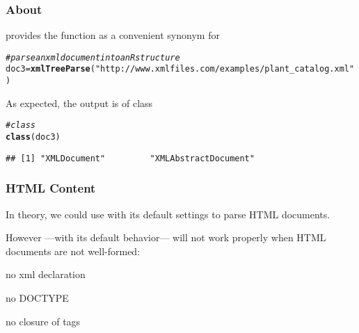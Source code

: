 \documentclass[12pt]{beamer}\usepackage[]{graphicx}\usepackage[]{color}
\makeatletter
\newcommand{\hlstr}[1]{\textcolor[rgb]{0.192,0.494,0.8}{#1}}%
\newcommand{\hlcom}[1]{\textcolor[rgb]{0.678,0.584,0.686}{\textit{#1}}}%
\newcommand{\hlstd}[1]{\textcolor[rgb]{0.345,0.345,0.345}{#1}}%
\newcommand{\hlkwb}[1]{\textcolor[rgb]{0.69,0.353,0.396}{#1}}%
\newcommand{\hlkwd}[1]{\textcolor[rgb]{0.737,0.353,0.396}{\textbf{#1}}}%
\newenvironment{kframe}{%
 \def\at@end@of@kframe{}%
 \ifinner\ifhmode%
  \def\at@end@of@kframe{\end{minipage}}%
  \begin{minipage}{\columnwidth}%
 \fi\fi%
 \def\FrameCommand##1{\hskip\@totalleftmargin \hskip-\fboxsep
 \colorbox{shadecolor}{##1}\hskip-\fboxsep
     \hskip-\linewidth \hskip-\@totalleftmargin \hskip\columnwidth}%
 \MakeFramed {\advance\hsize-\width
   \@totalleftmargin\z@ \linewidth\hsize
   \@setminipage}}%
 {\par\unskip\endMakeFramed%
 \at@end@of@kframe}
\newenvironment{knitrout}{}{} %
\makeatother
\begin{document}
\begin{frame}[fragile]
\frametitle{About }

 provides the function {\hilit {}} as a convenient synonym for 

\begin{knitrout}\scriptsize
{}\color{fgcolor}\begin{kframe}
\begin{alltt}
\hlcom{# parse an xml document into an R structure}
\hlstd{doc3} \hlkwb{=} \hlkwd{xmlTreeParse}\hlstd{(}\hlstr{"http://www.xmlfiles.com/examples/plant_catalog.xml"}\hlstd{)}
\end{alltt}
\end{kframe}
\end{knitrout}

As expected, the output is of class {\hilit {}}

\begin{knitrout}\footnotesize
{}\color{fgcolor}\begin{kframe}
\begin{alltt}
\hlcom{# class }
\hlkwd{class}\hlstd{(doc3)}
\end{alltt}
\begin{verbatim}
## [1] "XMLDocument"         "XMLAbstractDocument"
\end{verbatim}
\end{kframe}
\end{knitrout}
\eb

\end{frame}


\begin{frame}[fragile]
\frametitle{HTML Content}

In theory, we could use {\hilit {}} with its default settings to parse HTML documents. 

\bigskip
However  ---with its default behavior--- will not work properly when HTML documents are not well-formed:
\bi
 \item no xml declaration
 \item no DOCTYPE
 \item no closure of tags
\ei
\eb

\end{frame}
\end{document}
